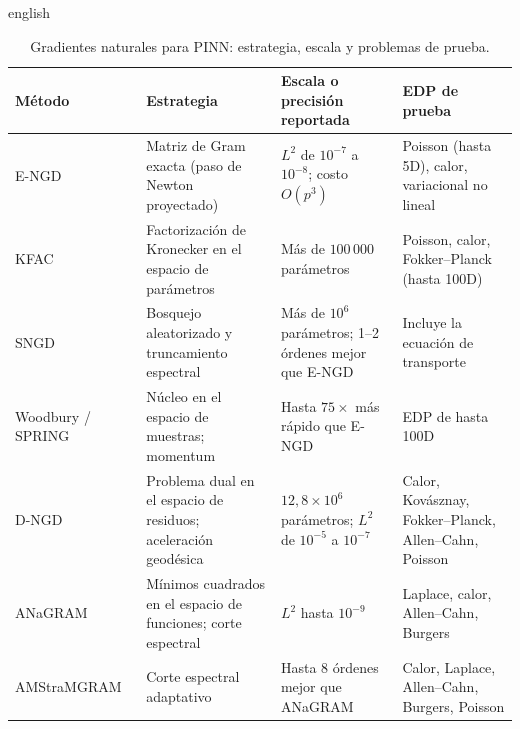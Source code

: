 \documentclass[0000.tex]{subfiles}
\begin{document}
\begin{hyphenrules}{english}
\begin{table}[htbp]
\centering\small
\caption{Gradientes naturales para PINN: estrategia, escala y problemas de prueba.}
\label{tab:ea-ngd}
\begin{tabularx}{\textwidth}{@{}l >{\raggedright\arraybackslash}X >{\raggedright\arraybackslash}X >{\raggedright\arraybackslash}X@{}}
\toprule
Método & Estrategia & Escala o precisión reportada & EDP de prueba \\
\midrule
E-NGD~\cite{muller2023achieving} & Matriz de Gram exacta (paso de Newton proyectado) & $L^2$ de $10^{-7}$ a $10^{-8}$; costo $O(p^3)$ & Poisson (hasta 5D), calor, variacional no lineal \\
KFAC~\cite{dangel2024kronecker} & Factorización de Kronecker en el espacio de parámetros & Más de $100\,000$ parámetros & Poisson, calor, Fokker--Planck (hasta 100D) \\
SNGD~\cite{mckay2025near} & Bosquejo aleatorizado y truncamiento espectral & Más de $10^6$ parámetros; 1--2 órdenes mejor que E-NGD & Incluye la ecuación de transporte \\
Woodbury / SPRING~\cite{guzman2025improving} & Núcleo en el espacio de muestras; momentum & Hasta $75\times$ más rápido que E-NGD & EDP de hasta 100D \\
D-NGD~\cite{jnini2025dual} & Problema dual en el espacio de residuos; aceleración geodésica & $12{,}8\times10^6$ parámetros; $L^2$ de $10^{-5}$ a $10^{-7}$ & Calor, Kovásznay, Fokker--Planck, Allen--Cahn, Poisson \\
ANaGRAM~\cite{schwencke2024anagram} & Mínimos cuadrados en el espacio de funciones; corte espectral & $L^2$ hasta $10^{-9}$ & Laplace, calor, Allen--Cahn, Burgers \\
AMStraMGRAM~\cite{schwencke2025amstramgram} & Corte espectral adaptativo & Hasta 8 órdenes mejor que ANaGRAM & Calor, Laplace, Allen--Cahn, Burgers, Poisson \\
\bottomrule
\end{tabularx}
\end{table}


\end{hyphenrules}
\end{document}
